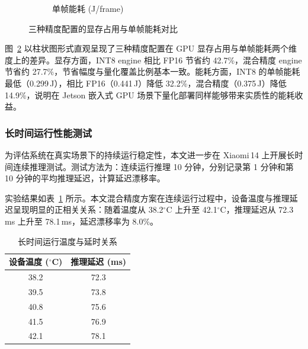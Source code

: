 \begin{figure}[htbp]
\begin{subfigure}[t]{0.48\textwidth}
    \caption{单帧能耗 \selectfont(J/frame)}
    \label{fig:jetson_energy}
  \end{subfigure}
  \caption{三种精度配置的显存占用与单帧能耗对比}
  \label{fig:jetson_resource}
\end{figure}

图~\ref{fig:jetson_resource} 以柱状图形式直观呈现了三种精度配置在 GPU 显存占用与单帧能耗两个维度上的差异。显存方面，INT8 engine 相比 FP16 节省约 42.7\%，混合精度 engine 节省约 27.7\%，节省幅度与量化覆盖比例基本一致。能耗方面，INT8 的单帧能耗最低（0.299\,J），相比 FP16（0.441\,J）降低 32.2\%，混合精度（0.375\,J）降低 14.9\%，说明在 Jetson 嵌入式 GPU 场景下量化部署同样能够带来实质性的能耗收益。

\subsubsection{长时间运行性能测试}

为评估系统在真实场景下的持续运行稳定性，本文进一步在 Xiaomi\,14 上开展长时间连续推理测试。测试方法为：连续运行推理 10 分钟，分别记录第 1 分钟和第 10 分钟的平均推理延迟，计算延迟漂移率。

实验结果如表~\ref{tab:long_run_test} 所示。本文混合精度方案在连续运行过程中，设备温度与推理延迟呈现明显的正相关关系：随着温度从 38.2$^\circ$C 上升至 42.1$^\circ$C，推理延迟从 72.3\,ms 上升至 78.1\,ms，延迟漂移率为 8.0\%。

\begin{table}[htbp]
  \centering
  \small
  \caption{长时间运行温度与延时关系}
  \label{tab:long_run_test}
  \begin{tabular}{cc}
    \toprule
    设备温度 ($^\circ$C) & 推理延迟 (ms) \\
    \midrule
    38.2 & 72.3 \\
    39.5 & 73.8 \\
    40.8 & 75.6 \\
    41.5 & 76.9 \\
    42.1 & 78.1 \\
    \bottomrule
  \end{tabular}
\end{table}

